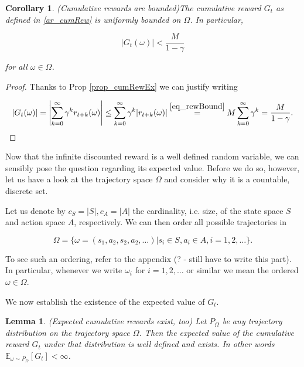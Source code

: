 \documentclass[11pt]{article} %
\newtheorem{lem}{Lemma}
\newtheorem{cor}{Corollary}
\begin{document}
\begin{cor}{(Cumulative rewards are bounded)}\label{cor_unifBoundCumRew}
	The cumulative reward $G_t$ as defined in \ref{ar_cumRew} is uniformly bounded on $\Omega$. In particular, 

	\begin{equation}\label{eq_boundCumRew}
		|G_t(\omega)| < \frac{M}{1 - \gamma}
	\end{equation}

	for all $\omega \in \Omega$.
\end{cor}

\begin{proof}
	Thanks to Prop \ref{prop_cumRewEx} we can justify writing

\begin{equation}
	|G_t(\omega)| = \left|\sum_{k=0}^{\infty} \gamma^k r_{t+k}(\omega) \right| \le \sum_{k=0}^{\infty} \gamma^k |r_{t+k}(\omega)| \overset{\ref{eq_rewBound}}{=} M \sum_{k=0}^{\infty} \gamma^k = \frac{M}{1 - \gamma}.
\end{equation}

\end{proof}

Now that the infinite discounted reward is a well defined random variable, we can sensibly pose the question regarding its expected value. Before we do so, however, let us have a look at the trajectory space $\Omega$ and consider why it is a countable, discrete set.

Let us denote by $c_S = |S|, c_A = |A|$ the cardinality, i.e. size, of the state space $S$ and action space $A$, respectively. We can then order all possible trajectories in 

\begin{equation}\label{def_traj}
	\Omega = \{ \omega = (s_1, a_2, s_2, a_2, \dots) | s_i \in S, a_i \in A, i=1,2,\dots \}.
\end{equation}

To see such an ordering, refer to the appendix (? - still have to write this part). In particular, whenever we write $\omega_i$ for $i = 1,2,\dots$ or similar we mean the ordered $\omega \in \Omega$.

We now establish the existence of the expected value of $G_t$.

\begin{lem}\label{lem_expCumRew}{(Expected cumulative rewards exist, too)}
	Let $P_\Omega$ be any trajectory distribution on the trajectory space $\Omega$. Then the expected value of the cumulative reward $G_t$ under that distribution is well defined and exists. In other words $\mathbb{E}_{\omega \sim P_{\Omega}}[G_t] < \infty$.
\end{lem}
\end{document}

